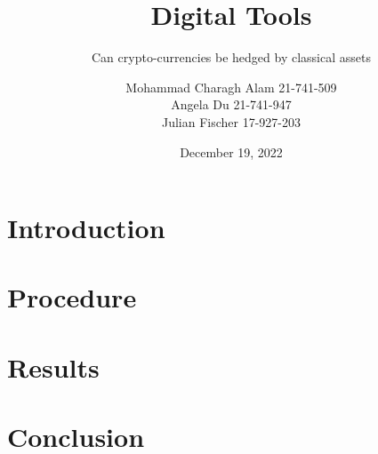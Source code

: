 \documentclass{beamer}
\title[Cryptos vs. traditional assets]{Digital Tools}
\subtitle{Can crypto-currencies be hedged by classical assets}
\author[Alam C M., Du A., Fischer J.]{Mohammad Charagh Alam 21-741-509\\Angela Du 21-741-947\\Julian Fischer 17-927-203}
\institute[UZH]{Faculty of Business, Economics and Informatics\\University of Zurich}
\date{December 19, 2022}
\begin{document}
\begin{frame}
\titlepage
\end{frame}


\section{Introduction}


\section{Procedure}


\section{Results}


\section{Conclusion}

\end{document}

